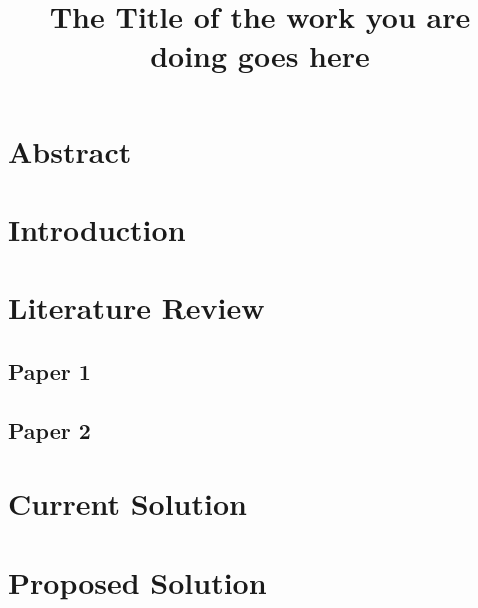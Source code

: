 \documentclass{seminarreport}
\title{The Title of the work you are doing goes here}
\begin{document}
	\makeseminarfirstpage
	\makeseminarsecondpage
	\bonafide
	\acknowledgement{\lipsum[1]}
	\newpage
	\tableofcontents
	\newpage
	\newpage
	\listoftables			%
	\listoffigures
	\newpage
	\section{Abstract}
	\setcounter{page}{1}
	\lipsum[2]
	\section{Introduction}
	\lipsum[3]
	\section{Literature Review}
	\subsection{Paper 1}
		\lipsum[4]
	\subsection{Paper 2}
		\lipsum[5]
	\section{Current Solution}
		\lipsum[6]
	\section{Proposed Solution}
		\lipsum[7]
\end{document}
